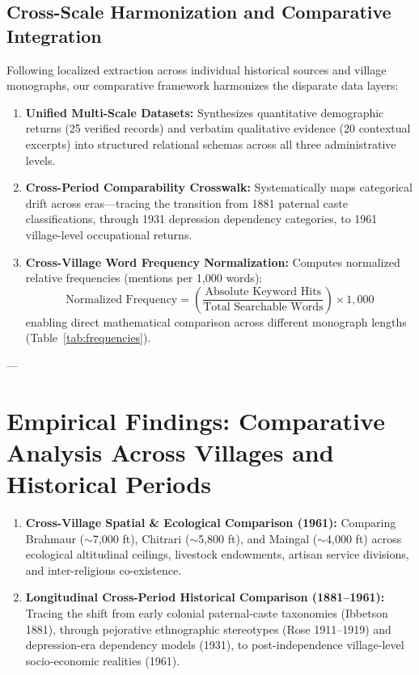 \documentclass[11pt,a4paper]{article}
\begin{document}
\subsection{Cross-Scale Harmonization and Comparative Integration}
Following localized extraction across individual historical sources and village monographs, our comparative framework harmonizes the disparate data layers:
\begin{enumerate}[leftmargin=*]
    \item \textbf{Unified Multi-Scale Datasets:} Synthesizes quantitative demographic returns (25 verified records) and verbatim qualitative evidence (20 contextual excerpts) into structured relational schemas across all three administrative levels.
    \item \textbf{Cross-Period Comparability Crosswalk:} Systematically maps categorical drift across eras---tracing the transition from 1881 paternal caste classifications, through 1931 depression dependency categories, to 1961 village-level occupational returns.
    \item \textbf{Cross-Village Word Frequency Normalization:} Computes normalized relative frequencies (mentions per 1,000 words):
    \[
    \text{Normalized Frequency} = \left( \frac{\text{Absolute Keyword Hits}}{\text{Total Searchable Words}} \right) \times 1,000
    \]
    enabling direct mathematical comparison across different monograph lengths (Table~\ref{tab:frequencies}).
\end{enumerate}

---

\section{Empirical Findings: Comparative Analysis Across Villages and Historical Periods}

\begin{enumerate}[leftmargin=*]
    \item \textbf{Cross-Village Spatial \& Ecological Comparison (1961):} Comparing Brahmaur ($\sim$7,000 ft), Chitrari ($\sim$5,800 ft), and Maingal ($\sim$4,000 ft) across ecological altitudinal ceilings, livestock endowments, artisan service divisions, and inter-religious co-existence.
    \item \textbf{Longitudinal Cross-Period Historical Comparison (1881--1961):} Tracing the shift from early colonial paternal-caste taxonomies (Ibbetson 1881), through pejorative ethnographic stereotypes (Rose 1911--1919) and depression-era dependency models (1931), to post-independence village-level socio-economic realities (1961).
\end{enumerate}
\end{document}
